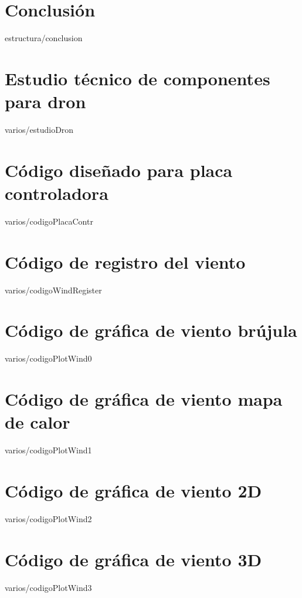 \documentclass[epsbased,lof,loe,loc,copyright,final,printable,extendedindex,firstnumbered,tfg,gnuplot]{tfgtfmthesisuam}
\begin{document}
\chapter{Conclusión\label{CAP:CONCLUSION}}{estructura/conclusion}

\appendix

\chapter{Estudio técnico de componentes para dron\label{CAP:ESTUDIOTECDRON}}{varios/estudioDron}

\chapter{Código diseñado para placa controladora}{varios/codigoPlacaContr}

\chapter{Código de registro del viento}{varios/codigoWindRegister}

\chapter{Código de gráfica de viento brújula}{varios/codigoPlotWind0}
\chapter{Código de gráfica de viento mapa de calor}{varios/codigoPlotWind1}
\chapter{Código de gráfica de viento 2D}{varios/codigoPlotWind2}
\chapter{Código de gráfica de viento 3D}{varios/codigoPlotWind3}
\end{document}
